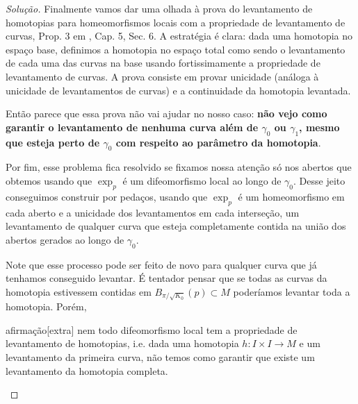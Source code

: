 \begin{proof}[Solução]
Finalmente vamos dar uma olhada à prova do levantamento de homotopias para homeomorfismos locais com a propriedade de levantamento de curvas, Prop. 3 em \cite{docsu}, Cap. 5, Sec. 6. A estratégia é clara: dada uma homotopia no espaço base, definimos a homotopia no espaço total como sendo o levantamento de cada uma das curvas na base usando fortissimamente a propriedade de levantamento de curvas. A prova consiste em provar unicidade (análoga à unicidade de levantamentos de curvas) e a continuidade da homotopia levantada.

Então parece que essa prova não vai ajudar no nosso caso: \textbf{não vejo como garantir o levantamento de nenhuma curva além de \(\gamma_0\) ou \(\gamma_1\), mesmo que esteja perto de \(\gamma_0\) com respeito ao parâmetro da homotopia}.

Por fim, esse problema fica resolvido se fixamos nossa atenção só nos abertos que obtemos usando que \(\operatorname{exp}_p\) é um difeomorfismo local ao longo de \(\gamma_0\). Desse jeito conseguimos construir por pedaços, usando que \(\operatorname{exp}_p\) é um homeomorfismo em cada aberto e a unicidade dos levantamentos em cada interseção, um levantamento de qualquer curva que esteja completamente contida na união dos abertos gerados ao longo de \(\gamma_0\).

Note que esse processo pode ser feito de novo para qualquer curva que já tenhamos conseguido levantar. É tentador pensar que se todas as curvas da homotopia estivessem contidas em \(B_{\pi/\sqrt{K_0}}(p) \subset M\) poderíamos levantar toda a homotopia. Porém,

\begin{thing7}{afirmação}[extra]\leavevmode
nem todo difeomorfismo local tem a propriedade de levantamento de homotopias, i.e. dada uma homotopia \(h:I \times I \to M\) e um levantamento da primeira curva, não temos como garantir que existe um levantamento da homotopia completa.
\end{thing7}


\end{proof}
